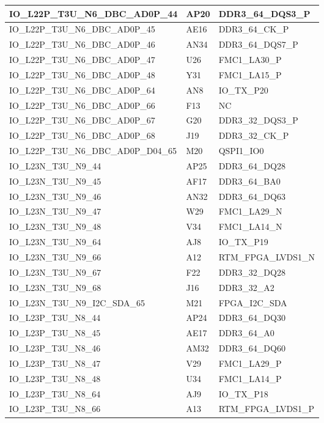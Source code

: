 \begin{footnotesize}
\begin{longtable}{|p{7cm}|p{1cm}|p{5cm}|}
IO\_L22P\_T3U\_N6\_DBC\_AD0P\_44	&	AP20	&	DDR3\_64\_DQS3\_P	\\ \hline
IO\_L22P\_T3U\_N6\_DBC\_AD0P\_45	&	AE16	&	DDR3\_64\_CK\_P	\\ \hline
IO\_L22P\_T3U\_N6\_DBC\_AD0P\_46	&	AN34	&	DDR3\_64\_DQS7\_P	\\ \hline
IO\_L22P\_T3U\_N6\_DBC\_AD0P\_47	&	U26	&	FMC1\_LA30\_P	\\ \hline
IO\_L22P\_T3U\_N6\_DBC\_AD0P\_48	&	Y31	&	FMC1\_LA15\_P	\\ \hline
IO\_L22P\_T3U\_N6\_DBC\_AD0P\_64	&	AN8	&	IO\_TX\_P20	\\ \hline
IO\_L22P\_T3U\_N6\_DBC\_AD0P\_66	&	F13	&	NC	\\ \hline
IO\_L22P\_T3U\_N6\_DBC\_AD0P\_67	&	G20	&	DDR3\_32\_DQS3\_P	\\ \hline
IO\_L22P\_T3U\_N6\_DBC\_AD0P\_68	&	J19	&	DDR3\_32\_CK\_P	\\ \hline
IO\_L22P\_T3U\_N6\_DBC\_AD0P\_D04\_65	&	M20	&	QSPI1\_IO0	\\ \hline
IO\_L23N\_T3U\_N9\_44	&	AP25	&	DDR3\_64\_DQ28	\\ \hline
IO\_L23N\_T3U\_N9\_45	&	AF17	&	DDR3\_64\_BA0	\\ \hline
IO\_L23N\_T3U\_N9\_46	&	AN32	&	DDR3\_64\_DQ63	\\ \hline
IO\_L23N\_T3U\_N9\_47	&	W29	&	FMC1\_LA29\_N	\\ \hline
IO\_L23N\_T3U\_N9\_48	&	V34	&	FMC1\_LA14\_N	\\ \hline
IO\_L23N\_T3U\_N9\_64	&	AJ8	&	IO\_TX\_P19	\\ \hline
IO\_L23N\_T3U\_N9\_66	&	A12	&	RTM\_FPGA\_LVDS1\_N	\\ \hline
IO\_L23N\_T3U\_N9\_67	&	F22	&	DDR3\_32\_DQ28	\\ \hline
IO\_L23N\_T3U\_N9\_68	&	J16	&	DDR3\_32\_A2	\\ \hline
IO\_L23N\_T3U\_N9\_I2C\_SDA\_65	&	M21	&	FPGA\_I2C\_SDA	\\ \hline
IO\_L23P\_T3U\_N8\_44	&	AP24	&	DDR3\_64\_DQ30	\\ \hline
IO\_L23P\_T3U\_N8\_45	&	AE17	&	DDR3\_64\_A0	\\ \hline
IO\_L23P\_T3U\_N8\_46	&	AM32	&	DDR3\_64\_DQ60	\\ \hline
IO\_L23P\_T3U\_N8\_47	&	V29	&	FMC1\_LA29\_P	\\ \hline
IO\_L23P\_T3U\_N8\_48	&	U34	&	FMC1\_LA14\_P	\\ \hline
IO\_L23P\_T3U\_N8\_64	&	AJ9	&	IO\_TX\_P18	\\ \hline
IO\_L23P\_T3U\_N8\_66	&	A13	&	RTM\_FPGA\_LVDS1\_P	\\ \hline

\end{longtable}
\end{footnotesize}
